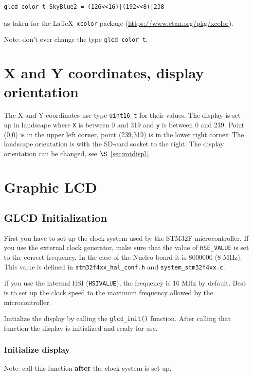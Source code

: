 \documentclass[12pt]{article}
\begin{document}
\begin{lstlisting}
glcd_color_t SkyBlue2 = (126<<16)|(192<<8)|238
\end{lstlisting}

as taken for the \LaTeX\ \lstinline|xcolor| package (\url{https://www.ctan.org/pkg/xcolor}).

Note: don't ever change the type \lstinline|glcd_color_t|.


\section{X and Y coordinates, display orientation}
The X and Y coordinates use type \lstinline|uint16_t| for their values. The display is set up in landscape where \lstinline|X| is between 0 and 319 and \lstinline|y| is between 0 and 239. Point (0,0) is in the upper left corner,
point (239,319) is in the lower right corner. The landscape orientation is with the SD-card socket to the right.
The display orientation can be changed, see $\S$~\ref{sec:rotdispl}.


\section{Graphic LCD}
\subsection{GLCD Initialization}
First you have to set up the clock system used by the STM32F microcontroller. If you use the external clock generator, make sure that the value of \lstinline|HSE_VALUE| is set to the correct frequency. In the case of the Nucleo board it is 8000000 (8 MHz). This value is defined in \lstinline|stm32f4xx_hal_conf.h| and \lstinline|system_stm32f4xx.c|.

If you use the internal HSI (\lstinline|HSIVALUE|), the frequency is 16 MHz by default. Best is to set up the clock speed to the maximum frequency allowed by the microcontroller.

Initialize the display by calling the \lstinline|glcd_init()| function. After calling that function the display is initialized and ready for use.

\subsubsection{Initialize display}
Note: call this function \textbf{after} the clock system is set up.
\end{document}
